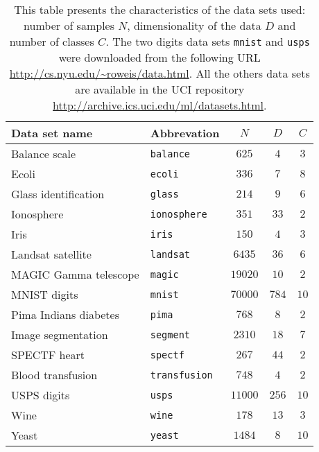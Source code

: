 % 


\begin{table}%
  \centering
    \begin{tabular}{l l c c c} \toprule
	Data set name&Abbrevation&$N$&$D$&$C$\\ 
	\midrule
	Balance scale&\texttt{balance}&$625$&$4$&$3$\\ 
	Ecoli&\texttt{ecoli}&$336$&$7$&$8$\\ 
	Glass identification&\texttt{glass}&$214$&$9$&$6$\\ 
	Ionosphere&\texttt{ionosphere}&$351$&$33$&$2$\\ 
	Iris&\texttt{iris}&$150$&$4$&$3$\\ 
	Landsat satellite&\texttt{landsat}&$6435$&$36$&$6$\\ 
	MAGIC Gamma telescope&\texttt{magic}&$19020$&$10$&$2$\\ 
	MNIST digits&\texttt{mnist}&$70000$&$784$&$10$\\ 
	Pima Indians diabetes&\texttt{pima}&$768$&$8$&$2$\\ 
	Image segmentation&\texttt{segment}&$2310$&$18$&$7$\\ 
	SPECTF heart&\texttt{spectf}&$267$&$44$&$2$\\ 
	Blood transfusion&\texttt{transfusion}&$748$&$4$&$2$\\ 
	USPS digits&\texttt{usps}&$11000$&$256$&$10$\\ 
	Wine&\texttt{wine}&$178$&$13$&$3$\\ 
	Yeast&\texttt{yeast}&$1484$&$8$&$10$\\  
      \bottomrule
    \end{tabular}
\caption{\small \small This table presents the characteristics of the data sets used: number of samples $N$, dimensionality of the data $D$ and number of classes $C$. The two digits data sets \texttt{mnist} and \texttt{usps} were downloaded from the following URL \protect\url{http://cs.nyu.edu/~roweis/data.html}. All the others data sets are available in the UCI repository \protect\url{http://archive.ics.uci.edu/ml/datasets.html}.}
\label{tab:datasets}
\end{table}

